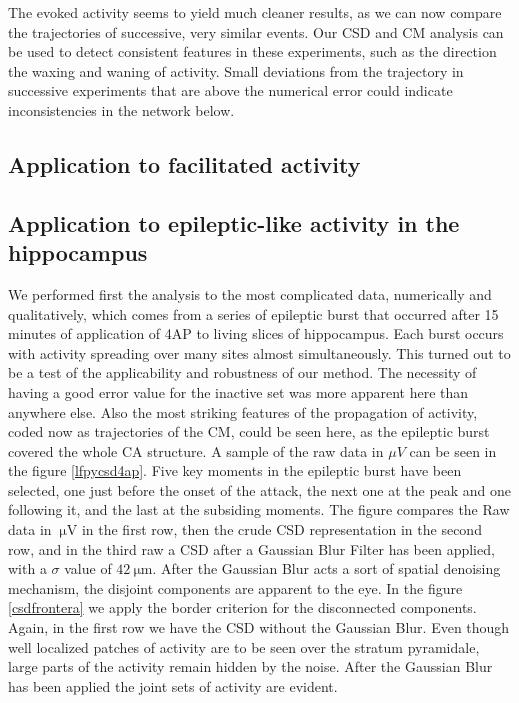 \documentclass[12pt, letterpaper]{article}
\newcommand{\mum}[1]{\SI{#1}{\micro\metre}}
\newcommand{\muV}[1]{\SI{#1}{\micro\volt}}
\begin{document}
The evoked activity seems to yield much cleaner results, as we can now compare the trajectories of successive, very similar events. Our CSD and CM analysis can be used to detect consistent features in these experiments, such as the direction the waxing and waning of activity. Small deviations from the trajectory in successive experiments that are above the numerical error could indicate inconsistencies in the network below. 

\subsection{Application to facilitated activity}


\subsection{Application to epileptic-like activity in the hippocampus}
We performed first the analysis to the most complicated data,
numerically and qualitatively, which comes from a series of epileptic burst
that occurred after 15 minutes of application of 4AP to living slices of
hippocampus. Each burst occurs with activity spreading over many sites almost
simultaneously. This turned out to be a test of the applicability and
robustness of our method. The necessity of having a good error value for the inactive set was more apparent here than anywhere else. Also the most striking features of the propagation of activity, coded now as trajectories of the CM, could be seen here, as the epileptic burst covered the whole CA structure. A sample of the raw data in $\mu V$ can be seen in the figure \ref{lfpycsd4ap}. Five key moments in the epileptic burst have been selected, one just before the onset of the attack, the next one at the peak and one  following it, and the last at the subsiding moments. The figure compares the Raw data
in $\muV{}$ in the first row, then the crude CSD representation in the second row, and
in the third raw a CSD after a Gaussian Blur Filter has been applied,
with a $\sigma$ value of $ \mum{42}$. After the Gaussian Blur acts a sort of
spatial denoising mechanism, the disjoint components are apparent to the eye.
In the figure \ref{csdfrontera} we apply the border criterion for the disconnected
components. Again, in the first row we have the CSD without the Gaussian Blur.
Even though well localized patches of activity are to be seen over the
stratum pyramidale, large parts of the activity remain hidden by the noise.
After the Gaussian Blur has been applied the joint sets of activity are evident. 
\end{document}
